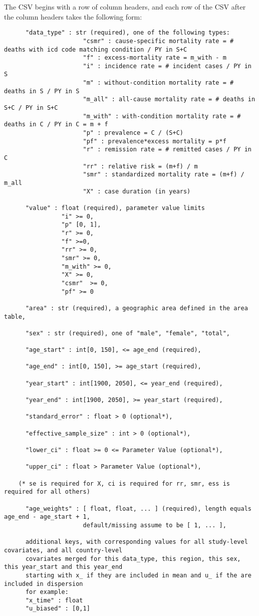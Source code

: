 The CSV begins with a row of column headers, and each row of the CSV after the column headers takes the following form:
\begin{verbatim}
      "data_type" : str (required), one of the following types:
                      "csmr" : cause-specific mortality rate = # deaths with icd code matching condition / PY in S+C
                      "f" : excess-mortality rate = m_with - m
                      "i" : incidence rate = # incident cases / PY in S
                      "m" : without-condition mortality rate = # deaths in S / PY in S
                      "m_all" : all-cause mortality rate = # deaths in S+C / PY in S+C
                      "m_with" : with-condition mortality rate = # deaths in C / PY in C = m + f
                      "p" : prevalence = C / (S+C)
                      "pf" : prevalence*excess mortality = p*f
                      "r" : remission rate = # remitted cases / PY in C
                      "rr" : relative risk = (m+f) / m
                      "smr" : standardized mortality rate = (m+f) / m_all
                      "X" : case duration (in years)

      "value" : float (required), parameter value limits
                "i" >= 0,
                "p" [0, 1],
                "r" >= 0,
                "f" >=0,
                "rr" >= 0,
                "smr" >= 0,
                "m_with" >= 0,
                "X" >= 0,
                "csmr"  >= 0,
                "pf" >= 0

      "area" : str (required), a geographic area defined in the area table,

      "sex" : str (required), one of "male", "female", "total",

      "age_start" : int[0, 150], <= age_end (required),

      "age_end" : int[0, 150], >= age_start (required),

      "year_start" : int[1900, 2050], <= year_end (required),

      "year_end" : int[1900, 2050], >= year_start (required),

      "standard_error" : float > 0 (optional*),

      "effective_sample_size" : int > 0 (optional*),

      "lower_ci" : float >= 0 <= Parameter Value (optional*),
      
      "upper_ci" : float > Parameter Value (optional*),

    (* se is required for X, ci is required for rr, smr, ess is required for all others)

      "age_weights" : [ float, float, ... ] (required), length equals age_end - age_start + 1,
                      default/missing assume to be [ 1, ... ],

      additional keys, with corresponding values for all study-level covariates, and all country-level   
      covariates merged for this data_type, this region, this sex, this year_start and this year_end
      starting with x_ if they are included in mean and u_ if the are included in dispersion
      for example:
      "x_time" : float
      "u_biased" : [0,1]
\end{verbatim}


